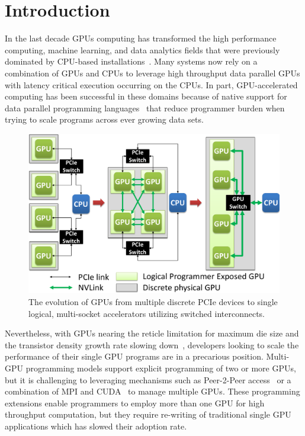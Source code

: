 \section{Introduction}
\label{introduction}

In the last decade GPUs computing has transformed the high performance 
computing, machine learning, and data analytics fields that were previously 
dominated by CPU-based 
installations~\cite{intersect360,cudnn,Lavin15b,SimonyanZ14a}. Many systems now 
rely on a combination of GPUs and CPUs to leverage high throughput data parallel 
GPUs with latency critical execution occurring on the CPUs. In part, 
GPU-accelerated computing has been successful in these domains because of native 
support for data parallel programming languages~\cite{CUDA7,OPENCL} that reduce 
programmer burden when trying to scale programs across ever growing data sets.

\begin{figure}[t]
\centering
\includegraphics[width=1.0\columnwidth]{figures/inter_gpu_connections.pdf}
\caption{The evolution of GPUs from multiple discrete PCIe devices to 
single logical, multi-socket accelerators utilizing switched interconnects.}
\label{fig:systemdiagram}
\vspace{-.2in}
\end{figure}

Nevertheless, with GPUs nearing the reticle limitation for maximum die size and 
the transistor density growth rate slowing down~\cite{mooredead2016}, developers 
looking to scale the performance of their single GPU programs are in a 
precarious position. Multi-GPU programming models support explicit programming 
of two or more GPUs, but it is challenging to leveraging mechanisms such as 
Peer-2-Peer access~\cite{NVIDIAP2P} or a combination of MPI and 
CUDA~\cite{NVIDIAMPI} to manage multiple GPUs. These programming extensions 
enable programmers to employ more than one GPU for high throughput computation, 
but they require re-writing of traditional single GPU applications which has 
slowed their adoption rate.

